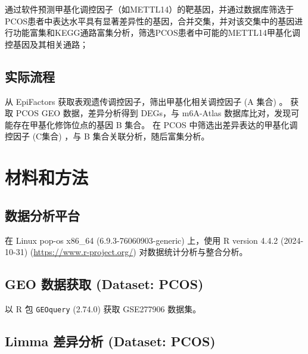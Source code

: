 \documentclass[
]{article}
\begin{document}
通过软件预测甲基化调控因子（如METTL14）的靶基因，并通过数据库筛选于PCOS患者中表达水平具有显著差异性的基因，合并交集，并对该交集中的基因进行功能富集和KEGG通路富集分析，筛选PCOS患者中可能的METTL14甲基化调控基因及其相关通路；

\hypertarget{ux5b9eux9645ux6d41ux7a0b}{%
\subsection{实际流程}\label{ux5b9eux9645ux6d41ux7a0b}}

从 EpiFactors 获取表观遗传调控因子，筛出甲基化相关调控因子 (A 集合) 。
获取 PCOS GEO 数据，差异分析得到 DEGs，与 m6A-Atlas 数据库比对，发现可能存在甲基化修饰位点的基因 B 集合。
在 PCOS 中筛选出差异表达的甲基化调控因子 (C集合) ，与 B 集合关联分析，随后富集分析。

\hypertarget{introduction}{%
\section{材料和方法}\label{introduction}}

\hypertarget{ux6570ux636eux5206ux6790ux5e73ux53f0}{%
\subsection{数据分析平台}\label{ux6570ux636eux5206ux6790ux5e73ux53f0}}

在 Linux pop-os x86\_64 (6.9.3-76060903-generic) 上，使用 R version 4.4.2 (2024-10-31) (\url{https://www.r-project.org/}) 对数据统计分析与整合分析。

\hypertarget{geo-ux6570ux636eux83b7ux53d6-dataset-pcos}{%
\subsection{GEO 数据获取 (Dataset: PCOS)}\label{geo-ux6570ux636eux83b7ux53d6-dataset-pcos}}

以 R 包 \texttt{GEOquery} (2.74.0) 获取 GSE277906 数据集。

\hypertarget{limma-ux5deeux5f02ux5206ux6790-dataset-pcos}{%
\subsection{Limma 差异分析 (Dataset: PCOS)}\label{limma-ux5deeux5f02ux5206ux6790-dataset-pcos}}
\end{document}
